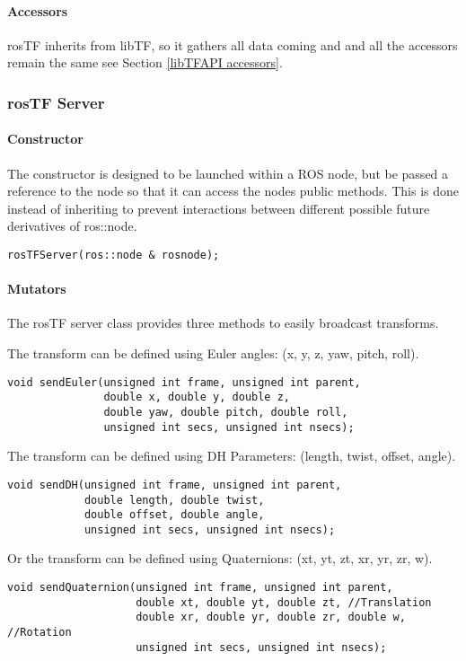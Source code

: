\documentclass[12pt]{article}
\begin{document}
\paragraph {Accessors}
rosTF inherits from libTF, so it gathers all data coming and 
and all the accessors remain the same see Section \ref{libTFAPI accessors}.


\subsubsection{rosTF Server}
\paragraph {Constructor}
The constructor is designed to be launched within a ROS node, but be passed a reference to 
the node so that it can access the nodes public methods.  This is done instead of inheriting
to prevent interactions between different possible future derivatives of ros::node. 
\begin{verbatim}
rosTFServer(ros::node & rosnode);
\end{verbatim}

\paragraph {Mutators}
The rosTF server class provides three methods to easily broadcast transforms.  

The transform can be defined using Euler angles: (x, y, z, yaw, pitch, roll).
\begin{verbatim}
void sendEuler(unsigned int frame, unsigned int parent, 
               double x, double y, double z, 
               double yaw, double pitch, double roll,
               unsigned int secs, unsigned int nsecs);
\end{verbatim}

The transform can be defined using DH Parameters: (length, twist, offset, angle).
\begin{verbatim}
void sendDH(unsigned int frame, unsigned int parent, 
            double length, double twist, 
            double offset, double angle, 
            unsigned int secs, unsigned int nsecs);
\end{verbatim}

Or the transform can be defined using Quaternions: (xt, yt, zt, xr, yr, zr, w).
\begin{verbatim}
void sendQuaternion(unsigned int frame, unsigned int parent, 
                    double xt, double yt, double zt, //Translation
                    double xr, double yr, double zr, double w, //Rotation
                    unsigned int secs, unsigned int nsecs);
\end{verbatim}
\end{document}

